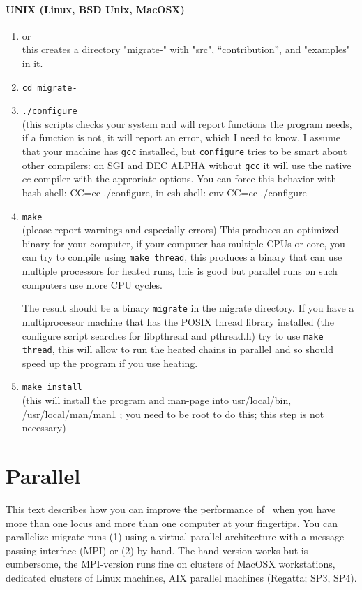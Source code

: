 \subsubsection{UNIX (Linux, BSD Unix, MacOSX)}
\begin{enumerate}
\item { or\\
}
   this creates a directory "migrate-\VERSION " with "src", ``contribution'',  and "examples" in it.
\item {\tt cd migrate-\VERSION }
\item {\tt ./configure} \\(this scripts checks your system and will report 
functions the program needs, if a function is not, it will report an error,
which I need to know. I assume that your machine has {\tt gcc} installed,
but {\tt configure} tries to be smart about other compilers: 
on SGI and DEC ALPHA without {\tt gcc} it will use the native 
$cc$ compiler with the approriate options. You can force this behavior
with bash shell: CC=cc ./configure, in csh shell: env CC=cc ./configure

\item  {\tt make}  \\
 (please report warnings and especially errors)
 This produces an optimized binary for your computer, if your computer has multiple CPUs or core, you can try to compile
 using {\tt make thread}, this produces a binary that can use multiple processors for heated runs, this is good but parallel
 runs on such computers use more CPU cycles.
 
 The result should be a binary {\tt migrate} in the migrate directory.
If you have a multiprocessor machine that has the POSIX thread library
installed (the configure script searches for libpthread and pthread.h)
try to use {\tt make thread}, this will allow to run the heated chains
in parallel and so should speed up the program if you use heating.
\item {\tt make install} \\ (this will install the program and man-page into usr/local/bin, /usr/local/man/man1
   ; you need to be root to do this; this step is not necessary)
\end{enumerate}


\chapter{Parallel \migrate}
This text describes how you can improve the performance of \migrate\ 
when you have more than one locus and more than one computer at 
your fingertips. You can parallelize migrate runs 
(1) using a virtual parallel architecture with a message-passing 
interface (MPI) or (2) by hand.
The hand-version works but is cumbersome, 
the MPI-version runs fine on clusters of MacOSX workstations, dedicated clusters of Linux machines, 
AIX parallel machines (Regatta; SP3, SP4).

